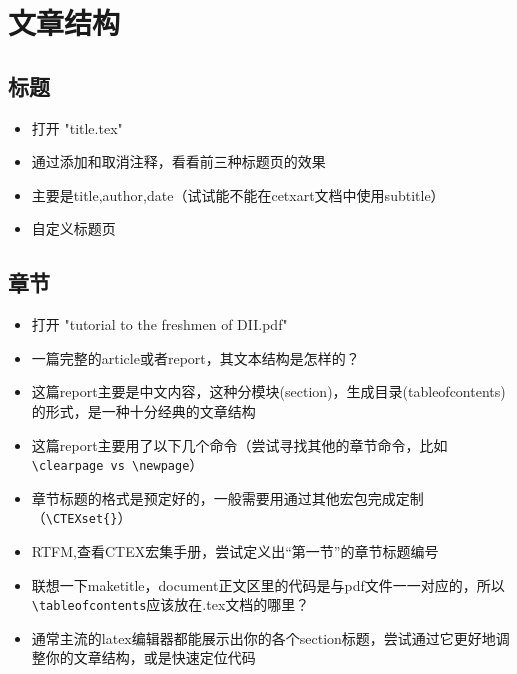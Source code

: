 \section{文章结构}

\subsection{标题}
	\begin{frame}
		\begin{itemize}
			\item 打开 "title.tex"
			\item 通过添加和取消注释，看看前三种标题页的效果
			\item 主要是title,author,date（试试能不能在cetxart文档中使用subtitle）
			\item 自定义标题页
		\end{itemize}
	\end{frame}


\subsection{章节}
	\begin{frame}
		\begin{itemize}
			\item 打开 "tutorial to the freshmen of DII.pdf"
			\item 一篇完整的article或者report，其文本结构是怎样的？
		\end{itemize}
	\end{frame}
	
	\begin{frame}[fragile]
		\begin{itemize}
			\item 这篇report主要是中文内容，这种分模块(section)，生成目录(tableofcontents)的形式，是一种十分经典的文章结构
			\item 这篇report主要用了以下几个命令（尝试寻找其他的章节命令，比如\verb|\clearpage vs \newpage|）
			\item 章节标题的格式是预定好的，一般需要用通过其他宏包完成定制（\verb|\CTEXset{}|）
			\item RTFM,查看CTEX宏集手册，尝试定义出“第一节”的章节标题编号
			\item 联想一下maketitle，document正文区里的代码是与pdf文件一一对应的，所以\verb|\tableofcontents|应该放在.tex文档的哪里？
			\item 通常主流的latex编辑器都能展示出你的各个section标题，尝试通过它更好地调整你的文章结构，或是快速定位代码
		\end{itemize}
	\end{frame}
	

